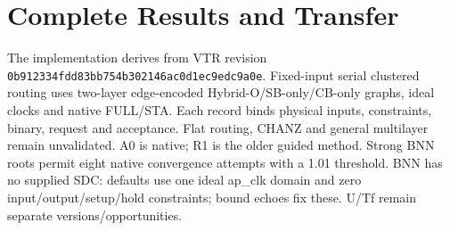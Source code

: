 \documentclass[conference,10pt]{IEEEtran}
\begin{document}
\section{Complete Results and Transfer}
The implementation derives from VTR revision \texttt{0b912334fdd83bb754b302146ac0d1ec9edc9a0e}. Fixed-input serial clustered routing uses two-layer edge-encoded Hybrid-O/SB-only/CB-only graphs, ideal clocks and native FULL/STA. Each record binds physical inputs, constraints, binary, request and acceptance. Flat routing, CHANZ and general multilayer remain unvalidated. A0 is native; R1 is the older guided method. Strong BNN roots permit eight native convergence attempts with a 1.01 threshold. BNN has no supplied SDC: defaults use one ideal ap\_clk domain and zero input/output/setup/hold constraints; bound echoes fix these. U/Tf remain separate versions/opportunities.
\end{document}
